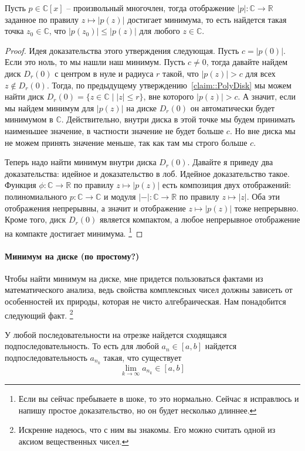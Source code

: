 \begin{claim}
Пусть $p\in \mathbb C[x]$ -- произвольный многочлен, тогда отображение $|p|\colon \mathbb C\to \mathbb R$ заданное по правилу $z\mapsto |p(z)|$ достигает минимума, то есть найдется такая точка $z_0\in\mathbb C$, что $|p(z_0)|\leqslant |p(z)|$ для любого $z\in \mathbb C$.
\end{claim}
\begin{proof}
Идея доказательства этого утверждения следующая.
Пусть $c = |p(0)|$.
Если это ноль, то мы нашли наш минимум.
Пусть $c\neq 0$, тогда давайте найдем диск $D_r(0)$ с центром в нуле и радиуса $r$ такой, что $|p(z)| > c$ для всех $z\notin D_r(0)$.
Тогда, по предыдущему утверждению~\ref{claim::PolyDisk} мы можем найти диск $D_r(0)= \{z\in\mathbb C\mid |z|\leqslant r\}$, вне которого $|p(z)|>c$.
А значит, если мы найдем минимум для $|p(z)|$ на диске $D_r(0)$ он автоматически будет минимумом в $\mathbb C$.
Действительно, внутри диска в этой точке мы будем принимать наименьшее значение, в частности значение не будет больше $c$.
Но вне диска мы не можем принять значение меньше, так как там мы строго больше $c$.

Теперь надо найти минимум внутри диска $D_r(0)$.
Давайте я приведу два доказательства: идейное и доказательство в лоб.
Идейное доказательство такое.
Функция $\phi\colon \mathbb C\to \mathbb R$ по правилу $z\mapsto |p(z)|$ есть композиция двух отображений: полиномиального $p\colon \mathbb C\to \mathbb C$ и модуля $|{-}|\colon \mathbb C\to\mathbb R$ по правилу $z\mapsto |z|$.
Оба эти отображения непрерывны, а значит и отображение $z\mapsto |p(z)|$ тоже непрерывно.
Кроме того, диск $D_r(0)$ является компактом, а любое непрерывное отображение на компакте достигает минимума.%
\footnote{Если вы сейчас пребываете в шоке, то это нормально.
Сейчас я исправлюсь и напишу простое доказательство, но он будет несколько длиннее.}
\end{proof}

\paragraph{Минимум на диске (по простому?)}

Чтобы найти минимум на диске, мне придется пользоваться фактами из математического анализа, ведь свойства комплексных чисел должны зависеть от особенностей их природы, которая не чисто алгебраическая.
Нам понадобится следующий факт.%
\footnote{Искренне надеюсь, что с ним вы знакомы.
Его можно считать одной из аксиом вещественных чисел.}
\begin{claim*}
[БД]
У любой последовательности на отрезке найдется сходящаяся подпоследовательность.
То есть для любой $a_n\in [a, b]$ найдется подпоследовательность $a_{n_k}$ такая, что существует
\[
\lim_{k\to \infty}a_{n_k}\in [a, b]
\]
\end{claim*}

